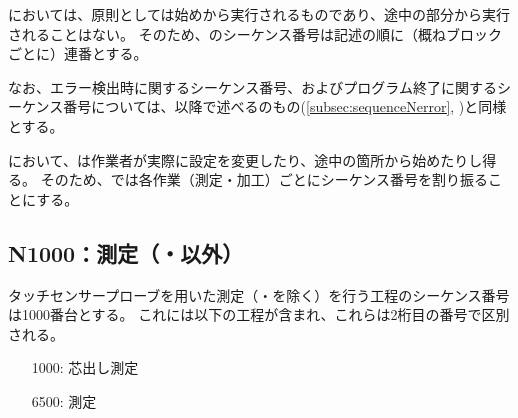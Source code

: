\DMC においては、原則として\CreatedNCSubPrg は始めから実行されるものであり、途中の部分から実行されることはない。
そのため、\nameCreatedNCSubPrg のシーケンス番号は記述の順に（概ねブロックごとに）連番とする。

なお、エラー検出時に関するシーケンス番号、およびプログラム終了に関するシーケンス番号については、以降で述べる\CreatedNCMainPrg のもの(\autoref{subsec:sequenceNerror}, )と同様とする。



\clearpage
\DMC において、\CreatedNCMainPrg は作業者が実際に設定を変更したり、途中の箇所から始めたりし得る。
そのため、\CreatedNCMainPrg では各作業（測定・加工）ごとにシーケンス番号を割り振ることにする。


\subsection{N1000：測定（\Dimple・\ReliefGroove 以外）}
タッチセンサープローブを用いた測定（\Dimple ・\ReliefGroove を除く）を行う工程のシーケンス番号は1000番台とする。
これには以下の工程が含まれ、これらは2桁目の番号で区別される。
\begin{enumerate}
\item[1000:] 芯出し測定
\item[6500:] \nameCenterlineEndFaceDif 測定
\end{enumerate}


